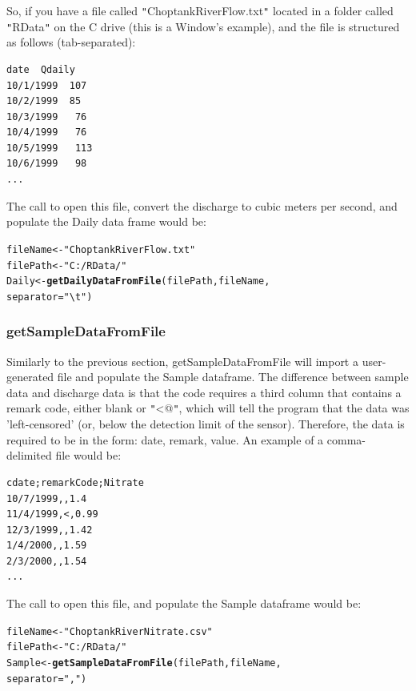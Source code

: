\documentclass[a4paper,11pt]{article}\usepackage[]{graphicx}\usepackage[]{color}
\makeatletter
\newcommand{\hlstr}[1]{\textcolor[rgb]{0.192,0.494,0.8}{#1}}%
\newcommand{\hlstd}[1]{\textcolor[rgb]{0.345,0.345,0.345}{#1}}%
\newcommand{\hlkwb}[1]{\textcolor[rgb]{0.69,0.353,0.396}{#1}}%
\newcommand{\hlkwc}[1]{\textcolor[rgb]{0.333,0.667,0.333}{#1}}%
\newcommand{\hlkwd}[1]{\textcolor[rgb]{0.737,0.353,0.396}{\textbf{#1}}}%
\newenvironment{kframe}{%
 \def\at@end@of@kframe{}%
 \ifinner\ifhmode%
  \def\at@end@of@kframe{\end{minipage}}%
  \begin{minipage}{\columnwidth}%
 \fi\fi%
 \def\FrameCommand##1{\hskip\@totalleftmargin \hskip-\fboxsep
 \colorbox{shadecolor}{##1}\hskip-\fboxsep
     \hskip-\linewidth \hskip-\@totalleftmargin \hskip\columnwidth}%
 \MakeFramed {\advance\hsize-\width
   \@totalleftmargin\z@ \linewidth\hsize
   \@setminipage}}%
 {\par\unskip\endMakeFramed%
 \at@end@of@kframe}
\newenvironment{knitrout}{}{} %
\makeatother
\begin{document}
So, if you have a file called \texttt{"}ChoptankRiverFlow.txt\texttt{"} located in a folder called \texttt{"}RData\texttt{"} on the C drive (this is a Window's example), and the file is structured as follows (tab-separated):
\begin{verbatim}
date  Qdaily
10/1/1999  107
10/2/1999  85
10/3/1999	76
10/4/1999	76
10/5/1999	113
10/6/1999	98
...
\end{verbatim}

The call to open this file, convert the discharge to cubic meters per second, and populate the Daily data frame would be:
\begin{knitrout}
\color{fgcolor}\begin{kframe}
\begin{alltt}
\hlstd{fileName} \hlkwb{<-} \hlstr{"ChoptankRiverFlow.txt"}
\hlstd{filePath} \hlkwb{<-}  \hlstr{"C:/RData/"}
\hlstd{Daily} \hlkwb{<-} \hlkwd{getDailyDataFromFile}\hlstd{(filePath,fileName,}
                    \hlkwc{separator}\hlstd{=}\hlstr{"\textbackslash{}t"}\hlstd{)}
\end{alltt}
\end{kframe}
\end{knitrout}


\FloatBarrier

\subsubsection{getSampleDataFromFile}
Similarly to the previous section, getSampleDataFromFile will import a user-generated file and populate the Sample dataframe. The difference between sample data and discharge data is that the code requires a third column that contains a remark code, either blank or \texttt{"}\verb@<@\texttt{"}, which will tell the program that the data was 'left-censored' (or, below the detection limit of the sensor). Therefore, the data is required to be in the form: date, remark, value.   An example of a comma-delimited file would be:

\begin{verbatim}
cdate;remarkCode;Nitrate
10/7/1999,,1.4
11/4/1999,<,0.99
12/3/1999,,1.42
1/4/2000,,1.59
2/3/2000,,1.54
...
\end{verbatim}
The call to open this file, and populate the Sample dataframe would be:
\begin{knitrout}
\color{fgcolor}\begin{kframe}
\begin{alltt}
\hlstd{fileName} \hlkwb{<-} \hlstr{"ChoptankRiverNitrate.csv"}
\hlstd{filePath} \hlkwb{<-}  \hlstr{"C:/RData/"}
\hlstd{Sample} \hlkwb{<-} \hlkwd{getSampleDataFromFile}\hlstd{(filePath,fileName,}
                                \hlkwc{separator}\hlstd{=}\hlstr{","}\hlstd{)}
\end{alltt}
\end{kframe}
\end{knitrout}
\end{document}
